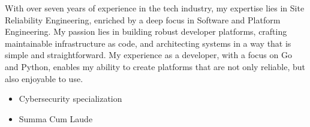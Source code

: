 \documentclass[10pt,a4paper,ragged2e,withhyper,hidelinks]{altacv}
\begin{document}

\begin{fullwidth}
\makecvheader
\end{fullwidth}



\begin{paracol}{2}



\small{With over seven years of experience in the tech industry, my expertise lies in Site Reliability Engineering, enriched by a deep focus in Software and Platform Engineering. My passion lies in building robust developer platforms, crafting maintainable infrastructure as code, and architecting systems in a way that is simple and straightforward. My experience as a developer, with a focus on Go and Python, enables my ability to create platforms that are not only reliable, but also enjoyable to use.}


\switchcolumn




\begin{itemize}
    \setlength{\itemindent}{0em}
    \item   \small{Cybersecurity specialization}
    \item   \small{Summa Cum Laude}
\end{itemize}

\end{paracol}

\medskip\medskip

\end{document}
